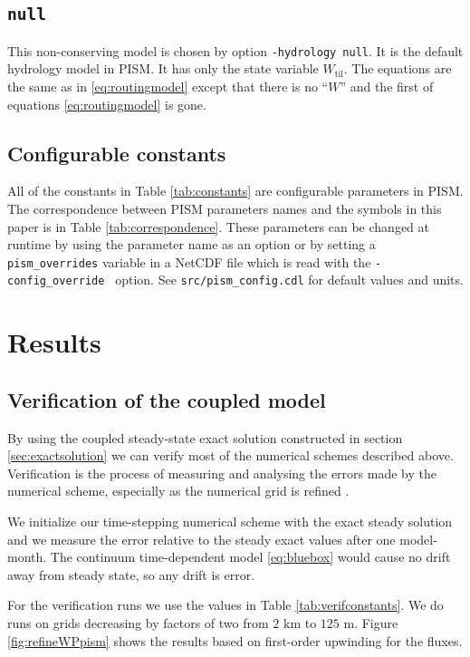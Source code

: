 \documentclass[gmd]{copernicus}   %
\newcommand{\text}{\textrm}
\newcommand{\Wtil}{W_{\text{til}}}
\begin{document}
\subsection{\texttt{null}}  This non-conserving model is chosen by option \texttt{-hydrology null}.  It is the default hydrology model in PISM.  It has only the state variable $\Wtil$.  The equations are the same as in \eqref{eq:routingmodel} except that there is no ``$W$'' and the first of equations \eqref{eq:routingmodel} is gone.

\subsection{Configurable constants}  All of the constants in Table \ref{tab:constants} are configurable parameters in PISM.  The correspondence between PISM parameters names and the symbols in this paper is in Table \ref{tab:correspondence}.  These parameters can be changed at runtime by using the parameter name as an option or by setting a \verb|pism_overrides| variable in a NetCDF file which is read with the \verb|-config_override | option.  See \verb|src/pism_config.cdl| for default values and units.


\section{Results}  \label{sec:results}

\subsection{Verification of the coupled model}  By using the coupled steady-state exact solution constructed in section \ref{sec:exactsolution} we can verify most of the numerical schemes described above.  Verification is the process of measuring and analysing the errors made by the numerical scheme, especially as the numerical grid is refined \citep{Wesseling,BLKCB}.

We initialize our time-stepping numerical scheme with the exact steady solution and we measure the error relative to the steady exact values after one model-month.  The continuum time-dependent model \eqref{eq:bluebox} would cause no drift away from steady state, so any drift is error.

For the verification runs we use the values in Table \ref{tab:verifconstants}.  We do runs on grids decreasing by factors of two from $2$ km to $125$ m.  Figure \ref{fig:refineWPpism} shows the results based on first-order upwinding for the fluxes.
\end{document}
